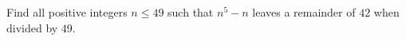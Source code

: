 Find all positive integers $n\leq49$ such that $n^5-n$ leaves a remainder of $42$ when divided by $49$.